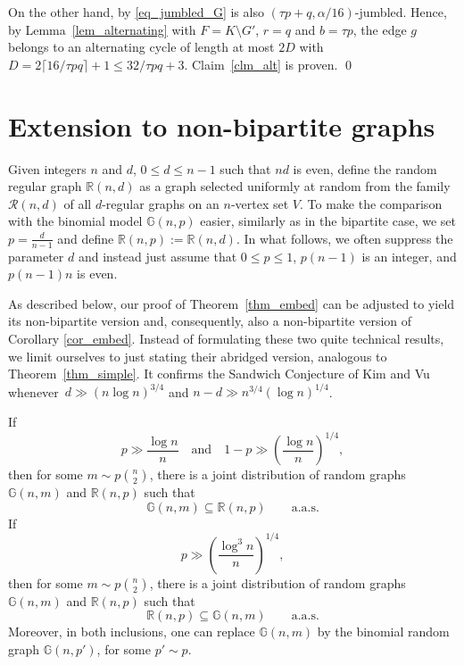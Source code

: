 \documentclass[12pt,reqno]{amsart}
\newcommand{\rc}{{\mathcal{R}}}
\newcommand{\R} {\mathbb R}
\newcommand{\G} {\mathbb G}
\theoremstyle{definition}
\newenvironment{manualtheorem}[1]{%
  \renewcommand\themanualtheoreminner{#1}%
  \manualtheoreminner
}
{
\endmanualtheoreminner
}
\begin{document}
 On the other hand, by \eqref{eq_jumbled_G} is also $(\tau p + q, \alpha/16)$-jumbled.
 Hence, by Lemma~\ref{lem_alternating} with $F = K\setminus G'$, $r = q$ and $b = \tau p$, the edge $g$ belongs to an alternating cycle of length at most $2D$ with $D = 2\lceil 16/\tau pq \rceil + 1 \le 32/\tau pq + 3$. Claim~\ref{clm_alt} is proven.
\qed


\section{Extension to non-bipartite graphs}
\label{sec_extension}

Given integers $n$ and $d$, $0\le d\le n-1$ such that $nd$ is even, define the random regular graph $\R(n,d)$ as a graph selected uniformly at random from the family $\rc(n,d)$ of all $d$-regular graphs on an $n$-vertex set $V$. To make the comparison with the binomial model $\G(n,p)$ easier, similarly as in the bipartite case, we set $p=\tfrac d{n-1}$ and define $\R(n,p):=\R(n,d)$. In what follows, we often suppress the parameter $d$  and instead just assume that $0\le p\le 1$, $p(n-1)$ is an integer, and $p(n-1)n$ is even.

As described below, our proof of Theorem~\ref{thm_embed} can be adjusted to yield its non-bipartite version and, consequently, also a non-bipartite version of Corollary \ref{cor_embed}. Instead of formulating these two quite technical results, we limit ourselves to just stating their abridged version, analogous to Theorem~\ref{thm_simple}. It confirms the Sandwich Conjecture of Kim and Vu \cite{KV04} whenever~$d \gg \left( n\log n \right)^{3/4}$ and $n - d \gg n^{3/4} (\log n)^{1/4} $.

\begin{manualtheorem}{\ref{thm_simple}$'$}
  \label{thm_simple_nonbip}
  If
\begin{equation}
  \label{eq_cond_nonbip}
p \gg \frac{\log n}{n}\quad\mbox{and}\quad
  1-p \gg \left( \frac{\log n}{n}\right)^{1/4},
	\end{equation}
	then for some $m \sim p\binom n2$, there is a joint distribution of random graphs $\G(n,m)$ and $\R(n,p)$ such that
    \begin{equation*}
	    \G(n,m) \subseteq \R(n,p) \qquad \text{a.a.s.}
    \end{equation*}
    If
    \[
      p\gg\left(\frac{\log^3 n}{n}\right)^{1/4},
    \]
    then for some $m \sim p\binom n2$, there is a joint distribution of random graphs $\G(n,m)$ and $\R(n,p)$ such that
    \begin{equation*}
	    \R(n,p) \subseteq \G(n,m)  \qquad \text{a.a.s.}
    \end{equation*}
    Moreover, in both inclusions, one can replace $\G(n,m)$ by the binomial random graph $\G(n,p')$, for some $p' \sim p$.
\end{manualtheorem}
\end{document}
